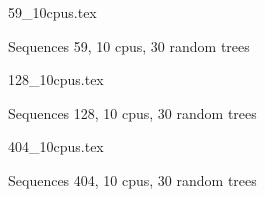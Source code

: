 \documentclass[12pt,a4paper]{article}
\begin{document}
 
\begin{figure}
\caption*{Sequences 59, 10 cpus, 30 random trees}
{59_10cpus.tex}
\end{figure}
 
\begin{figure}
\caption*{Sequences 128, 10 cpus, 30 random trees}
{128_10cpus.tex}
\end{figure}

 
\begin{figure}
\caption*{Sequences 404, 10 cpus, 30 random trees}
{404_10cpus.tex}
\end{figure}
\end{document}
